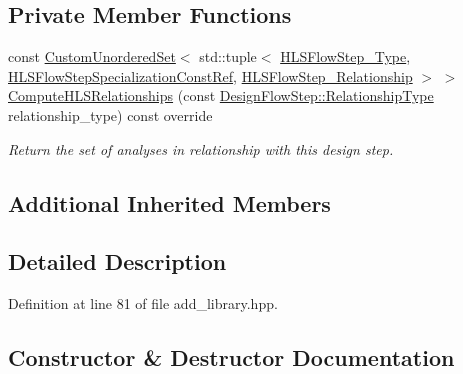\subsection*{Private Member Functions}
\begin{DoxyCompactItemize}
\item 
const \hyperlink{classCustomUnorderedSet}{Custom\+Unordered\+Set}$<$ std\+::tuple$<$ \hyperlink{hls__step_8hpp_ada16bc22905016180e26fc7e39537f8d}{H\+L\+S\+Flow\+Step\+\_\+\+Type}, \hyperlink{hls__step_8hpp_a5fdd2edf290c196531d21d68e13f0e74}{H\+L\+S\+Flow\+Step\+Specialization\+Const\+Ref}, \hyperlink{hls__step_8hpp_a3ad360b9b11e6bf0683d5562a0ceb169}{H\+L\+S\+Flow\+Step\+\_\+\+Relationship} $>$ $>$ \hyperlink{classadd__library_aecfd57b77ce6a35da898612dd02950a6}{Compute\+H\+L\+S\+Relationships} (const \hyperlink{classDesignFlowStep_a723a3baf19ff2ceb77bc13e099d0b1b7}{Design\+Flow\+Step\+::\+Relationship\+Type} relationship\+\_\+type) const override
\begin{DoxyCompactList}\small\item\em Return the set of analyses in relationship with this design step. \end{DoxyCompactList}\end{DoxyCompactItemize}
\subsection*{Additional Inherited Members}


\subsection{Detailed Description}


Definition at line 81 of file add\+\_\+library.\+hpp.



\subsection{Constructor \& Destructor Documentation}
\mbox{\label{classadd__library_a6633753f977e754dcb60f0391be7d37d}} 
